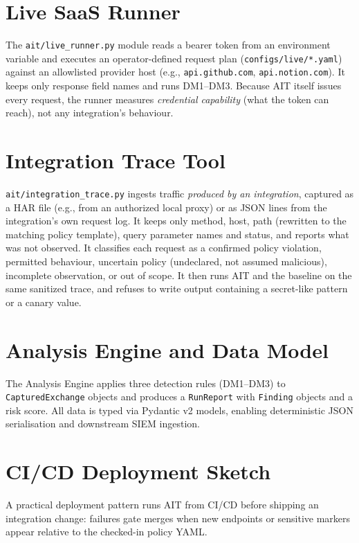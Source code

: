 \documentclass[12pt,a4paper]{report}
\begin{document}
\section{Live SaaS Runner}

The \texttt{ait/live\_runner.py} module reads a bearer token from an environment variable and
executes an operator-defined request plan (\texttt{configs/live/*.yaml}) against an allowlisted
provider host (e.g., \texttt{api.github.com}, \texttt{api.notion.com}). It keeps only response
field names and runs DM1--DM3. Because AIT itself issues every request, the runner measures
\emph{credential capability} (what the token can reach), not any integration's behaviour.

\section{Integration Trace Tool}

\texttt{ait/integration\_trace.py} ingests traffic \emph{produced by an integration}, captured as
a HAR file (e.g., from an authorized local proxy) or as JSON lines from the integration's own
request log. It keeps only method, host, path (rewritten to the matching policy template), query
parameter names and status, and reports what was not observed. It classifies each request as a
confirmed policy violation, permitted behaviour, uncertain policy (undeclared, not assumed
malicious), incomplete observation, or out of scope. It then runs AIT and the baseline on the same
sanitized trace, and refuses to write output containing a secret-like pattern or a canary value.

\section{Analysis Engine and Data Model}

The Analysis Engine applies three detection rules (DM1--DM3) to \texttt{CapturedExchange} objects and
produces a \texttt{RunReport} with \texttt{Finding} objects and a risk score. All data is typed
via Pydantic v2 models, enabling deterministic JSON serialisation and downstream SIEM ingestion.

\section{CI/CD Deployment Sketch}

A practical deployment pattern runs AIT from CI/CD before shipping an integration change:
failures gate merges when new endpoints or sensitive markers appear relative to the checked-in
policy YAML.
\end{document}

